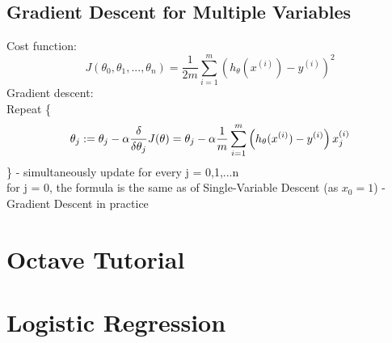 \documentclass{scrartcl}
\begin{document}
\subsection {Gradient Descent for Multiple Variables}
Cost function:
\[
J(\theta_0, \theta_1, ..., \theta_n) = \frac{1}{2m} \sum\limits_{i=1}^m\left(h_\theta(x^{(i)}) - y^{(i)} \right)^2
\]
Gradient descent: \\
Repeat \{
 \[ \theta_j := \theta_j - \alpha \frac
 {\delta}{\delta\theta_j}J(\theta) \\
= \theta_j - \alpha \frac{1}{m}  \sum\limits_{i=1}^m\left(h_\theta(x^{(i)}) - y^{(i)} \right)x_j^{(i)} \]
\} - simultaneously update for every j = 0,1,...n \\
for j = 0, the formula is the same as of Single-Variable Descent (as
$x_0 = 1$)
\label {4-3} - Gradient Descent in practice


\section {Octave Tutorial}



\section {Logistic Regression}

\end{document}
